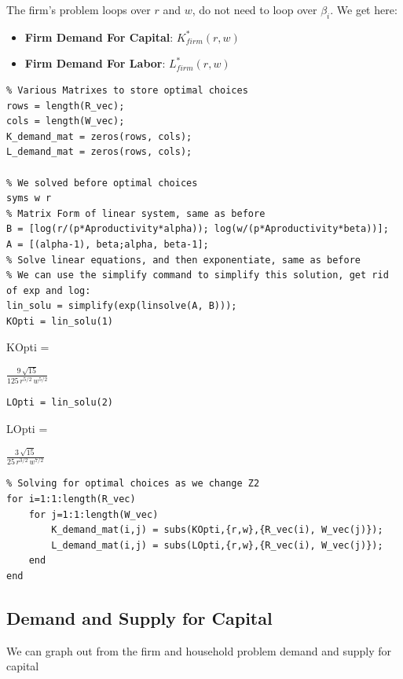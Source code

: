 \documentclass[
]{book}
\begin{document}
The firm's problem loops over \(r\) and \(w\), do not need to loop over
\(\beta_i\). We get here:

\begin{itemize}
\item
  \textbf{Firm Demand For Capital}: \(K_{firm}^* (r,w)\)
\item
  \textbf{Firm Demand For Labor}: \(L_{firm}^* (r,w)\)
\end{itemize}

\begin{verbatim}
% Various Matrixes to store optimal choices
rows = length(R_vec);
cols = length(W_vec);
K_demand_mat = zeros(rows, cols);
L_demand_mat = zeros(rows, cols);

% We solved before optimal choices
syms w r
% Matrix Form of linear system, same as before
B = [log(r/(p*Aproductivity*alpha)); log(w/(p*Aproductivity*beta))];
A = [(alpha-1), beta;alpha, beta-1];
% Solve linear equations, and then exponentiate, same as before
% We can use the simplify command to simplify this solution, get rid of exp and log:
lin_solu = simplify(exp(linsolve(A, B)));
KOpti = lin_solu(1)
\end{verbatim}

KOpti =

\(\displaystyle \frac{9\,\sqrt{15}}{125\,r^{5/2} \,w^{5/2} }\)

\begin{verbatim}
LOpti = lin_solu(2)
\end{verbatim}

LOpti =

\(\displaystyle \frac{3\,\sqrt{15}}{25\,r^{3/2} \,w^{7/2} }\)

\begin{verbatim}
% Solving for optimal choices as we change Z2
for i=1:1:length(R_vec)
    for j=1:1:length(W_vec)
        K_demand_mat(i,j) = subs(KOpti,{r,w},{R_vec(i), W_vec(j)});
        L_demand_mat(i,j) = subs(LOpti,{r,w},{R_vec(i), W_vec(j)});
    end
end
\end{verbatim}

\hypertarget{demand-and-supply-for-capital}{%
\subsection{Demand and Supply for Capital}\label{demand-and-supply-for-capital}}

We can graph out from the firm and household problem demand and supply
for capital
\end{document}
